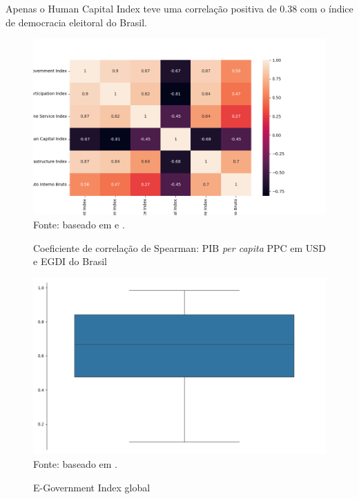 Apenas o Human Capital Index teve uma correlação positiva de 0.38 com o índice de democracia eleitoral do Brasil.

\begin{figure}[H]
    \centering
    \caption{Coeficiente de correlação de Spearman: PIB \textit{per capita} PPC em USD e EGDI do Brasil}
    \includegraphics[width=1\linewidth]{figuras/egdi/correlacao6.png}
    \label{fig:correlacao6}
    \footnotesize{Fonte: baseado em \cite{ONU_edgi_mapa} e \cite{WB_pib_per_capita_paises}.}
\end{figure}


\begin{figure}[H]
    \centering
    \caption{E-Government Index global}
    \includegraphics[width=1\linewidth]{figuras/egdi/boxplot_egov_global.png}
    \label{fig:boxplot_egov_global}
    \footnotesize{Fonte: baseado em \cite{ONU_edgi_mapa}.}
\end{figure}

